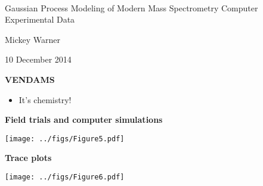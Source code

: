 \documentclass[mathserif, 11pt, t]{beamer}
\renewcommand{\subtitle}[1]{\vspace{0.45cm}\textcolor{bluegreen}{
    {\textbf{#1}}}\vspace{0.15cm}\newline}
\begin{document}
\begin{center}
\ \\ [-0.5in]
\vfill
\bigskip
\bigskip
\bigskip
\bigskip
\bigskip

\begin{LARGE}
\begin{center}
Gaussian Process Modeling of Modern Mass Spectrometry Computer Experimental Data
\end{center}
\end{LARGE}
\vfill

\begin{center}
Mickey Warner
\end{center}
\vfill
10 December 2014
\bigskip
\bigskip
\bigskip
\vfill
\ \\ [-0.5in]
\end{center}

\begin{frame}
\subtitle{VENDAMS}
\begin{itemize}[label={$\cdot$}]
\item It's chemistry!
\end{itemize}
\end{frame}

\begin{frame}
\subtitle{Field trials and computer simulations}
\begin{center}
\texttt{[image: ../figs/Figure5.pdf]}
\end{center}
\end{frame}

\begin{frame}
\subtitle{Trace plots}
\begin{center}
\texttt{[image: ../figs/Figure6.pdf]}
\end{center}
\end{frame}
\end{document}
